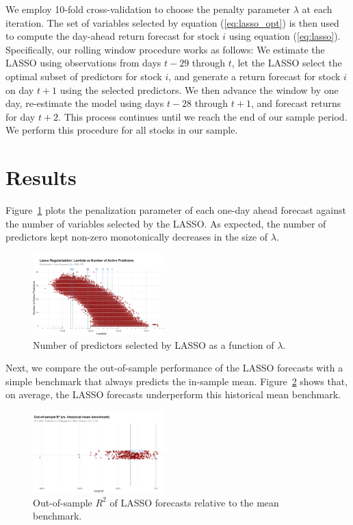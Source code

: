 \documentclass[10pt,twocolumn]{article}
\begin{document}
We employ 10-fold cross-validation to choose the penalty parameter $\lambda$ at each iteration. The set of variables selected by equation (\ref{eq:lasso_opt}) is then used to compute the day-ahead return forecast for stock $i$ using equation (\ref{eq:lasso}). \\ Specifically, our rolling window procedure works as follows: We estimate the LASSO using observations from days $t-29$ through $t$, let the LASSO select the optimal subset of predictors for stock $i$, and generate a return forecast for stock $i$ on day $t+1$ using the selected predictors. We then advance the window by one day, re-estimate the model using days $t-28$ through $t+1$, and forecast returns for day $t+2$. This process continues until we reach the end of our sample period. We perform this procedure for all stocks in our sample.

\section{Results}
\label{sec:results}

Figure~\ref{fig:var_selec} plots the penalization parameter of each one-day ahead forecast against the number of variables selected by the LASSO. As expected, the number of predictors kept non-zero monotonically decreases in the size of $\lambda$.

\begin{figure}[h!] %
    \centering
    \includegraphics[width=0.45\textwidth]{lambdavspredictors.png} 
    \caption{Number of predictors selected by LASSO as a function of $\lambda$.}
    \label{fig:var_selec} %
\end{figure}

Next, we compare the out-of-sample performance of the LASSO forecasts with a simple benchmark that always predicts the in-sample mean. Figure~\ref{fig:r2_oos_lasso} shows that, on average, the LASSO forecasts underperform this historical mean benchmark.

\begin{figure}[h!] %
    \centering
    \includegraphics[width=0.45\textwidth]{r2_oss.png} 
    \caption{Out-of-sample $R^2$ of LASSO forecasts relative to the mean benchmark.}
    \label{fig:r2_oos_lasso} %
\end{figure}
\end{document}
